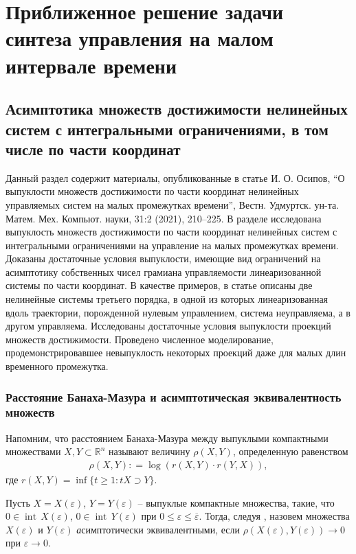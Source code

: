 \documentclass[../main.tex]{subfiles}
\begin{document}
\clearpage
\section{Приближенное решение задачи синтеза управления на малом интервале времени}
\subsection{Асимптотика множеств достижимости нелинейных систем с интегральными ограничениями, в том числе по части координат} 
Данный раздел содержит материалы, опубликованные в статье И. О. Осипов, “О выпуклости множеств достижимости по части координат нелинейных управляемых систем на малых промежутках времени”, Вестн. Удмуртск. ун-та. Матем. Мех. Компьют. науки, 31:2 (2021),  210–225. В разделе исследована выпуклость множеств достижимости по части координат нелинейных систем с интегральными ограничениями на управление на малых промежутках времени.
Доказаны достаточные условия выпуклости, имеющие вид ограничений на асимптотику собственных чисел грамиана управляемости линеаризованной системы по части координат.
В качестве примеров, в статье описаны две нелинейные системы третьего порядка, в одной из которых линеаризованная вдоль траектории, порожденной нулевым управлением, система неуправляема, а в другом управляема.
Исследованы достаточные условия выпуклости проекций множеств достижимости. 
Проведено численное моделирование, продемонстрировавшее невыпуклость некоторых проекций даже для малых длин временного промежутка.
\subsubsection{Расстояние Банаха-Мазура и асимптотическая эквивалентность множеств}\label{sec21:AsymptoticEquality}
Напомним, что расстоянием Банаха-Мазура между выпуклыми компактными множествами $ X,Y \subset \mathbb R^n $ называют величину $ \rho (X, Y)  $, определенную равенством 
\begin{gather*}
	\rho (X, Y): = \log (r(X,Y) \cdot r(Y, X)),
\end{gather*}
где $r(X, Y) = \inf \{t \geq 1: tX \supset Y \}$.

Пусть $ X = X(\varepsilon) $,  $ Y = Y(\varepsilon) $ -- выпуклые компактные множества, такие, что $ 0 \in \operatorname{int}\,X(\varepsilon) $, $ 0 \in \operatorname{int}\,Y(\varepsilon) $ при $0 \leqslant \varepsilon \leqslant \overline{\varepsilon} $.  Тогда, следуя \cite{Ovs}, назовем множества $  X(\varepsilon)  $ и $  Y(\varepsilon) $ {\textit асимптотически эквивалентными}, если $  \rho (X(\varepsilon), Y(\varepsilon)) \rightarrow 0 $ при $\varepsilon \rightarrow 0 $.
\end{document}

